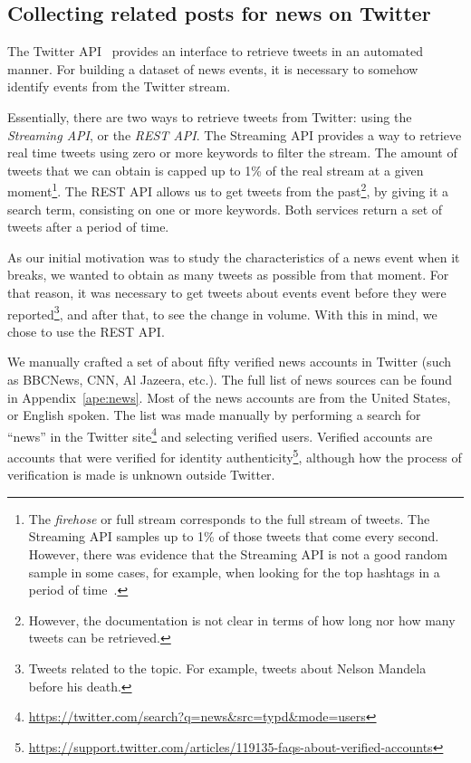 \subsection{Collecting related posts for news on Twitter}

The Twitter API~\cite{twitterapi} provides an interface to retrieve tweets in an
automated manner. For building a dataset of news events, it is necessary to
somehow identify events from the Twitter stream.

Essentially, there are two ways to retrieve tweets from Twitter: using the
{\em Streaming API}, or the {\em REST API}. 
%
The Streaming API provides a way to retrieve real time tweets using zero or more
keywords to filter the stream. 
%
The amount of tweets that we can obtain is capped up to 1\% of the real stream
at a given moment\footnote{The \emph{firehose} or full stream corresponds to the
full stream of tweets. The Streaming API samples up to 1\% of those tweets that
come every second. However, there was evidence that the Streaming API is not a
good random sample in some cases, for example, when looking for the top hashtags
in a period of time~\cite{morstatter2013sample}.}.  
%
The REST API allows us to get tweets from the past\footnote{However, the
documentation is not clear in terms of how long nor how many tweets can be
retrieved.}, by giving it a search term, consisting on one or more keywords. 
%
Both services return a set of tweets after a period of time. 

As our initial motivation was to study the characteristics of a news event when
it breaks, we wanted to obtain as many tweets as possible from that moment.
%
For that reason, it was necessary to get tweets about events event before they
were reported\footnote{Tweets related to the topic. For example, tweets about
Nelson Mandela before his death.}, and after that, to see the change in volume.
%
With this in mind, we chose to use the REST API.

We manually crafted a set of about fifty verified news accounts in Twitter (such
as BBCNews, CNN, Al Jazeera, etc.). 
%
The full list of news sources can be found in Appendix~\ref{ape:news}.
%
Most of the news accounts are from the United States, or English spoken.
%
The list was made manually by performing a search for ``news'' in the Twitter
site\footnote{\url{https://twitter.com/search?q=news&src=typd&mode=users}} and
selecting verified users. 
%
Verified accounts are accounts that were verified for identity
authenticity\footnote{\url{https://support.twitter.com/articles/119135-faqs-about-verified-accounts}},
although how the process of verification is made is unknown outside Twitter. 

